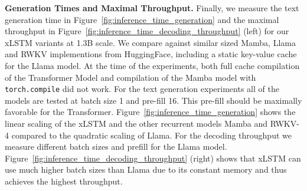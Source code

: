 \documentclass[dvipsnames]{article}
\begin{document}
\textbf{Generation Times and Maximal Throughput.}
Finally, we measure the text generation time in Figure~\ref{fig:inference_time_generation} and the maximal throughput in Figure~\ref{fig:inference_time_decoding_throughput} (left) for our xLSTM variants at 1.3B scale. 
We compare against similar sized Mamba, Llama and RWKV implementions from HuggingFace, including a static key-value cache for the Llama model. 
At the time of the experiments, both full cache compilation of the Transformer Model and compilation of the Mamba model with \texttt{torch.compile} did not work. 
For the text generation experiments all of the models are tested at batch size 1 and pre-fill 16. 
This pre-fill should be maximally favorable for the Transformer.
Figure~\ref{fig:inference_time_generation} shows the linear scaling of the xLSTM and the other recurrent models Mamba and RWKV-4 compared to the quadratic scaling of Llama. 
For the decoding throughput we measure different batch sizes and prefill for the Llama model. 
Figure~\ref{fig:inference_time_decoding_throughput} (right) shows that xLSTM can use much higher batch sizes than Llama due to its constant memory and thus achieves the highest throughput.
\end{document}
